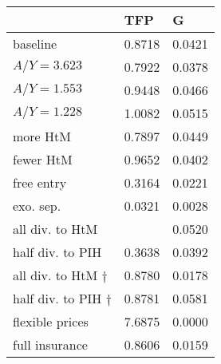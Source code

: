 \begin{tabular}{lll}
\toprule
 & TFP & G \\
\midrule
baseline & 0.8718 & 0.0421 \\
$A/Y = 3.623$ & 0.7922 & 0.0378 \\
$A/Y = 1.553$ & 0.9448 & 0.0466 \\
$A/Y = 1.228$ & 1.0082 & 0.0515 \\
more HtM & 0.7897 & 0.0449 \\
fewer HtM & 0.9652 & 0.0402 \\
free entry & 0.3164 & 0.0221 \\
exo. sep. & 0.0321 & 0.0028 \\
all div. to HtM &  & 0.0520 \\
half div. to PIH & 0.3638 & 0.0392 \\
all div. to HtM $\dagger$ & 0.8780 & 0.0178 \\
half div. to PIH $\dagger$ & 0.8781 & 0.0581 \\
flexible prices & 7.6875 & 0.0000 \\
full insurance & 0.8606 & 0.0159 \\
\bottomrule
\end{tabular}

